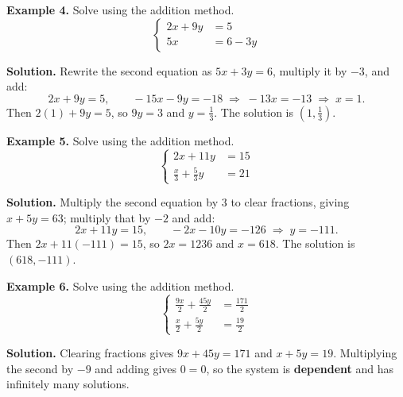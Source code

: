 \documentclass{ximera}
\begin{document}
\begin{problem}

\textbf{Example 4.} Solve using the addition method.
\[
  \left\{\begin{aligned}
    2x+9y &= 5 \\
    5x &= 6-3y
  \end{aligned}\right.
\]

\begin{hint}
\textbf{Solution.} Rewrite the second equation as $5x+3y=6$, multiply it by $-3$, and
add:
\[
  2x+9y=5, \qquad -15x-9y=-18 \;\Longrightarrow\; -13x=-13 \;\Longrightarrow\; x=1 .
\]
Then $2(1)+9y=5$, so $9y=3$ and $y=\tfrac{1}{3}$. The solution is
$\left(1,\tfrac{1}{3}\right)$.
\end{hint}
\end{problem}

\begin{problem}

\textbf{Example 5.} Solve using the addition method.
\[
  \left\{\begin{aligned}
    2x+11y &= 15 \\
    \tfrac{x}{3}+\tfrac{5}{3}y &= 21
  \end{aligned}\right.
\]

\begin{hint}
\textbf{Solution.} Multiply the second equation by 3 to clear fractions, giving
$x+5y=63$; multiply that by $-2$ and add:
\[
  2x+11y=15, \qquad -2x-10y=-126 \;\Longrightarrow\; y=-111 .
\]
Then $2x+11(-111)=15$, so $2x=1236$ and $x=618$. The solution is $(618,-111)$.
\end{hint}
\end{problem}

\begin{problem}

\textbf{Example 6.} Solve using the addition method.
\[
  \left\{\begin{aligned}
    \tfrac{9x}{2}+\tfrac{45y}{2} &= \tfrac{171}{2} \\
    \tfrac{x}{2}+\tfrac{5y}{2} &= \tfrac{19}{2}
  \end{aligned}\right.
\]

\begin{hint}
\textbf{Solution.} Clearing fractions gives $9x+45y=171$ and $x+5y=19$. Multiplying the
second by $-9$ and adding gives $0=0$, so the system is \textbf{dependent} and has
infinitely many solutions.
\end{hint}
\end{problem}
\end{document}
